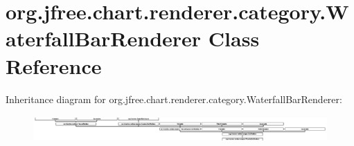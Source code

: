 \hypertarget{classorg_1_1jfree_1_1chart_1_1renderer_1_1category_1_1_waterfall_bar_renderer}{}\section{org.\+jfree.\+chart.\+renderer.\+category.\+Waterfall\+Bar\+Renderer Class Reference}
\label{classorg_1_1jfree_1_1chart_1_1renderer_1_1category_1_1_waterfall_bar_renderer}
Inheritance diagram for org.\+jfree.\+chart.\+renderer.\+category.\+Waterfall\+Bar\+Renderer\+:\begin{figure}[H]
\begin{center}
\leavevmode
\includegraphics[height=1.030928cm]{classorg_1_1jfree_1_1chart_1_1renderer_1_1category_1_1_waterfall_bar_renderer}
\end{center}
\end{figure}
